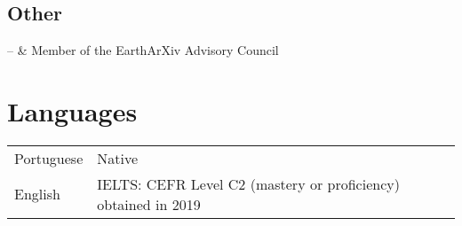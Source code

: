 \documentclass[11pt, a4paper]{article}
\newcommand{\TablePad}{\vspace{-0.4cm}}
\newcommand{\Duration}[2]{\fontsize{10pt}{0}\selectfont #1--#2}
\newcommand{\Ongoing}{}
\begin{document}
\subsection{Other}

\begin{EntriesTable}
    \Duration{2019}{\Ongoing} & Member of the EarthArXiv Advisory Council
\end{EntriesTable}


\section{Languages}

\TablePad
\begin{tabularx}{\textwidth}{@{}p{} p{}@{}}
    Portuguese & Native
    \\
    English & IELTS: CEFR Level C2 (mastery or proficiency) obtained in 2019
\end{tabularx}
\end{document}
